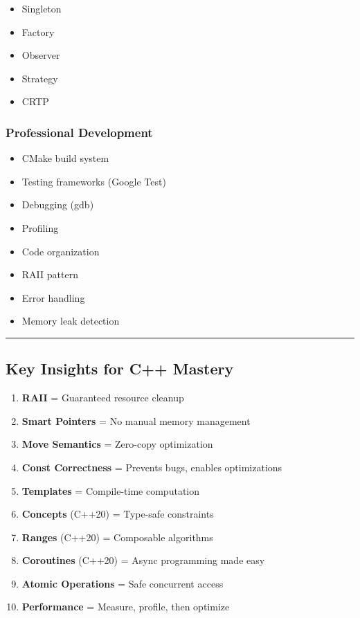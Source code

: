 \begin{itemize}
\tightlist
\item
  Singleton
\item
  Factory
\item
  Observer
\item
  Strategy
\item
  CRTP
\end{itemize}

\hypertarget{professional-development}{%
\subsubsection{Professional
Development}\label{professional-development}}

\begin{itemize}
\tightlist
\item
  CMake build system
\item
  Testing frameworks (Google Test)
\item
  Debugging (gdb)
\item
  Profiling
\item
  Code organization
\item
  RAII pattern
\item
  Error handling
\item
  Memory leak detection
\end{itemize}

\begin{center}\rule{0.5\linewidth}{0.5pt}\end{center}

\hypertarget{key-insights-for-c-mastery}{%
\subsection{Key Insights for C++
Mastery}\label{key-insights-for-c-mastery}}

\begin{enumerate}
\def\labelenumi{\arabic{enumi}.}
\tightlist
\item
  \textbf{RAII} = Guaranteed resource cleanup
\item
  \textbf{Smart Pointers} = No manual memory management
\item
  \textbf{Move Semantics} = Zero-copy optimization
\item
  \textbf{Const Correctness} = Prevents bugs, enables optimizations
\item
  \textbf{Templates} = Compile-time computation
\item
  \textbf{Concepts} (C++20) = Type-safe constraints
\item
  \textbf{Ranges} (C++20) = Composable algorithms
\item
  \textbf{Coroutines} (C++20) = Async programming made easy
\item
  \textbf{Atomic Operations} = Safe concurrent access
\item
  \textbf{Performance} = Measure, profile, then optimize
\end{enumerate}

